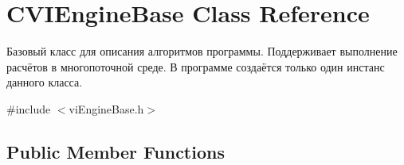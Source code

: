 \hypertarget{class_c_v_i_engine_base}{\section{C\+V\+I\+Engine\+Base Class Reference}
\label{class_c_v_i_engine_base}
}


Базовый класс для описания алгоритмов программы. Поддерживает выполнение расчётов в многопоточной среде. В программе создаётся только один инстанс данного класса.  




{\ttfamily \#include $<$vi\+Engine\+Base.\+h$>$}

\subsection*{Public Member Functions}
